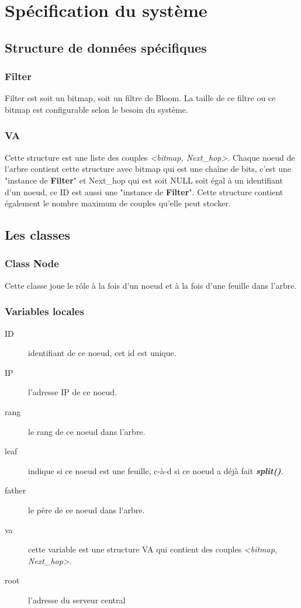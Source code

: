 \documentclass[a4paper,11pt]{report}
\begin{document}
\chapter{Spécification du système}
\section{Structure de données spécifiques}

\subsection{Filter}
	Filter est soit un bitmap, soit un filtre de Bloom. La taille de ce filtre ou ce bitmap est configurable selon le besoin du système. 
	
\subsection{VA}
	Cette structure est une liste des couples \textit{<bitmap, Next\_hop>}. Chaque noeud de l'arbre contient cette structure avec bitmap qui est une chaîne de bits, c'est une "instance de \textbf{Filter}" et Next\_hop qui est soit NULL soit égal à un identifiant d'un noeud, ce ID est aussi une "instance de \textbf{Filter}". Cette structure contient également le nombre maximum de couples qu'elle peut stocker. 
	
\section{Les classes}
\subsection{Class Node}
	Cette classe joue le rôle à la fois d'un noeud et à la fois d'une feuille dans l'arbre.
	
\subsection{Variables locales}
	\begin{description}
		\item[ID] identifiant de ce noeud, cet id est unique.
		\item[IP] l'adresse IP de ce noeud.
		\item[rang] le rang de ce noeud dans l'arbre.
		\item[leaf] indique si ce noeud est une feuille, c-à-d si ce noeud a déjà fait \textbf{\textit{split()}}.
		\item[father] le père de ce noeud dans l'arbre.
		\item[va] cette variable est une structure VA qui contient des couples \textit{<bitmap, Next\_hop>}.
		\item[root] l'adresse du serveur central
	\end{description}
	
\end{document}
